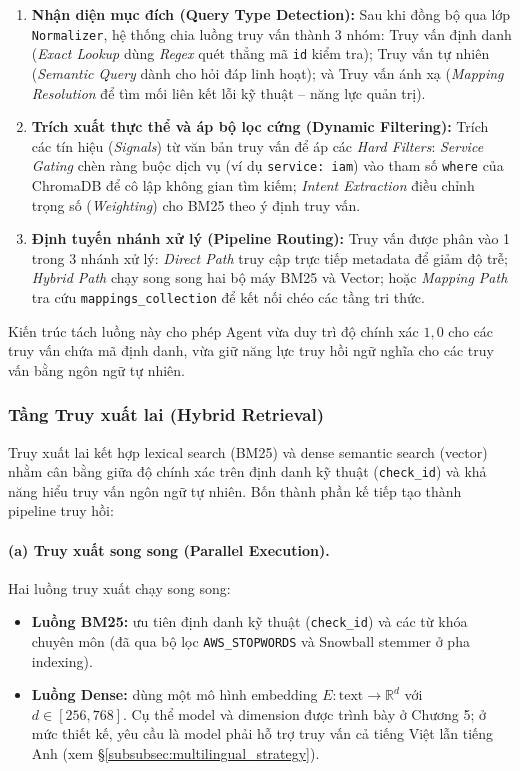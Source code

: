 \begin{enumerate}
    \item \textbf{Nhận diện mục đích (Query Type Detection):} Sau khi đồng bộ qua lớp \texttt{Normalizer}, hệ thống chia luồng truy vấn thành 3 nhóm: Truy vấn định danh (\textit{Exact Lookup} dùng \textit{Regex} quét thẳng mã \texttt{id} kiểm tra); Truy vấn tự nhiên (\textit{Semantic Query} dành cho hỏi đáp linh hoạt); và Truy vấn ánh xạ (\textit{Mapping Resolution} để tìm mối liên kết lỗi kỹ thuật – năng lực quản trị).
    
    \item \textbf{Trích xuất thực thể và áp bộ lọc cứng (Dynamic Filtering):} Trích các tín hiệu (\textit{Signals}) từ văn bản truy vấn để áp các \textit{Hard Filters}: \textit{Service Gating} chèn ràng buộc dịch vụ (ví dụ \texttt{service: iam}) vào tham số \texttt{where} của ChromaDB để cô lập không gian tìm kiếm; \textit{Intent Extraction} điều chỉnh trọng số (\textit{Weighting}) cho BM25 theo ý định truy vấn.

    \item \textbf{Định tuyến nhánh xử lý (Pipeline Routing):} Truy vấn được phân vào 1 trong 3 nhánh xử lý: \textit{Direct Path} truy cập trực tiếp metadata để giảm độ trễ; \textit{Hybrid Path} chạy song song hai bộ máy BM25 và Vector; hoặc \textit{Mapping Path} tra cứu \texttt{mappings\_collection} để kết nối chéo các tầng tri thức.
\end{enumerate}

Kiến trúc tách luồng này cho phép Agent vừa duy trì độ chính xác $1{,}0$ cho các truy vấn chứa mã định danh, vừa giữ năng lực truy hồi ngữ nghĩa cho các truy vấn bằng ngôn ngữ tự nhiên.






\subsubsection*{Tầng Truy xuất lai (Hybrid Retrieval)}
\label{subsec:hybrid_retrieval}

Truy xuất lai kết hợp lexical search (BM25) và dense semantic search (vector) nhằm cân bằng giữa độ chính xác trên định danh kỹ thuật (\texttt{check\_id}) và khả năng hiểu truy vấn ngôn ngữ tự nhiên. Bốn thành phần kế tiếp tạo thành pipeline truy hồi:

\paragraph*{(a) Truy xuất song song (Parallel Execution).}
Hai luồng truy xuất chạy song song:
\begin{itemize}
  \item \textbf{Luồng BM25:} ưu tiên định danh kỹ thuật (\texttt{check\_id}) và các từ khóa chuyên môn (đã qua bộ lọc \texttt{AWS\_STOPWORDS} và Snowball stemmer ở pha indexing).
  \item \textbf{Luồng Dense:} dùng một mô hình embedding $E: \text{text} \to \mathbb{R}^d$ với $d \in [256, 768]$. Cụ thể model và dimension được trình bày ở Chương 5; ở mức thiết kế, yêu cầu là model phải hỗ trợ truy vấn cả tiếng Việt lẫn tiếng Anh (xem \S\ref{subsubsec:multilingual_strategy}).
\end{itemize}

